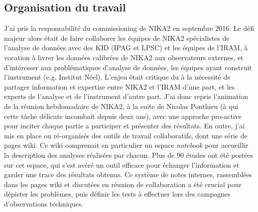 \subsection{Organisation du travail}

J'ai pris la responsabilité du commissioning de NIKA2 en septembre
2016. Le défi majeur alors était de faire collaborer les équipes de
NIKA2 spécialistes de l'analyse de données avec des KID (IPAG et LPSC)
et les équipes de l'IRAM, à vocation à livrer les données calibrées de
NIKA2 aux observateurs externes, et d'intéresser aux problématiques
d'analyse de données, les équipes ayant construit l'instrument
(e.g. Institut Néel). L'enjeu était critique du à la nécessité de
partager information et expertise entre NIKA2 et l'IRAM d'une part, et
les experts de l'analyse et de l'instrument d'autre part. J'ai donc
repris l'animation de la réunion hebdomadaire de NIKA2, à la suite de
Nicolas Ponthieu (à qui cette tâche délicate incombait depuis deux
ans), avec une approche pro-active pour inciter chaque partie a
participer et présenter des résultats. En outre, j'ai mis en place ou
ré-organisés des outils de travail collaboratifs, dont une série de
pages wiki. Ce wiki comprenait en particulier un espace
\emph{notebook} pour accueillir la description des analyses réalisées
par chacun. Plus de 90 études ont été postées sur cet espace, qui
s'est avéré un outil efficace pour échanger l'information et garder
une trace des résultats obtenus. Ce système de notes internes,
rassemblées dans les pages wiki et discutées en réunion de
collaboration a été crucial pour dépister les problèmes, puis définir
les tests à effectuer lors des campagnes d'observations techniques.

